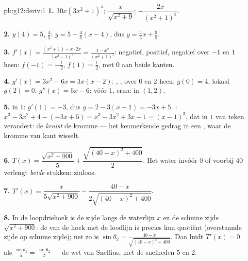 \begin{solution}{pb:g12:deriv:1}
\textbf{1.} $30x\left(3x^2 + 1\right)^4$; \quad
$\dfrac{x}{\sqrt{x^2 + 9}}$; \quad
$-\dfrac{2x}{\left(x^2 + 1\right)^2}$.

\textbf{2.} $y(4) = 5$,  $\frac45$: 
$y = 5 + \frac45(x - 4)$, dus $y = \frac45 x + \frac95$.

\textbf{3.} $f'(x) = \frac{(x^2 + 1) - x \cdot 2x}{(x^2+1)^2}
= \frac{1 - x^2}{(x^2 + 1)^2}$: negatief, positief, negatief over $-1$ en
$1$ heen:  $f(-1) = -\frac12$,  $f(1) = \frac12$, met
 $0$ aan beide kanten.

\textbf{4.} $g'(x) = 3x^2 - 6x = 3x(x - 2)$: , ,  over
$0$ en $2$ heen;  $g(0) = 4$, lokaal  $g(2) = 0$.
$g''(x) = 6x - 6$:  vóór $1$,  erna:  in $(1, 2)$.

\textbf{5.}  in $1$:  $g'(1) = -3$, dus
$y = 2 - 3(x - 1) = -3x + 5$. :
$x^3 - 3x^2 + 4 - (-3x + 5) = x^3 - 3x^2 + 3x - 1 = (x - 1)^3$, dat in $1$
van teken verandert: de  \emph{kruist} de kromme --- het kenmerkende
gedrag in een , waar de kromme van kant wisselt.

\textbf{6.} $T(x) = \dfrac{\sqrt{x^2 + 900}}{5} +
\dfrac{\sqrt{(40 - x)^2 + 400}}{2}$. Het water invóór $0$ of voorbij $40$
verlengt \emph{beide} stukken: zinloos.

\textbf{7.} $T'(x) = \dfrac{x}{5\sqrt{x^2 + 900}} -
\dfrac{40 - x}{2\sqrt{(40 - x)^2 + 400}}$.

\textbf{8.} In de loopdriehoek is de zijde langs de waterlijn $x$ en de
schuine zijde $\sqrt{x^2 + 900}$: de  van de hoek met de loodlijn is
precies hun quotiënt (overstaande zijde op schuine zijde); net zo is
$\sin\theta_2 = \frac{40 - x}{\sqrt{(40-x)^2 + 400}}$. Dan luidt
$T'(x) = 0$ als $\frac{\sin\theta_1}{5} = \frac{\sin\theta_2}{2}$ --- de wet
van Snellius, met de snelheden $5$ en $2$.


\end{solution}
